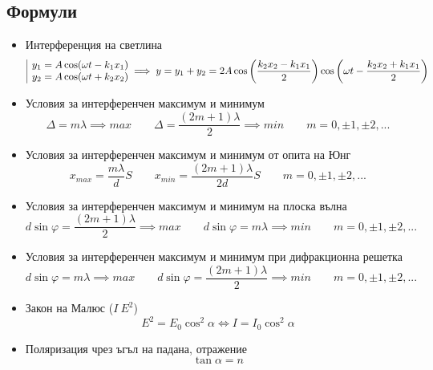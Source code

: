 \documentclass[fleqn, 12pt]{article}
\theoremstyle{definition}
\begin{document}
\subsection{Формули}
\begin{itemize}
\item Интерференция на светлина
$$\begin{array}{|l@{}} 
y_1 = A \cos (\omega t - k_1x_1)\\ 
y_2 = A \cos (\omega t + k_2x_2)
 \end{array} \implies y = y_1 + y_2 = 
2A\cos \left( \frac{k_2x_2 - k_1x_1}{2} \right) \cos \left( \omega t - \frac{k_2x_2 + k_1x_1}{2} \right) $$
\item Условия за интерференчен максимум и минимум
$$\Delta = m\lambda \implies max \qquad \Delta = \frac{(2m+1)\lambda}{2} \implies min \qquad m = 0, \pm1, \pm 2, ...$$
\item Условия за интерференчен максимум и минимум от опита на Юнг
$$ x_{max} = \frac{m\lambda}{d}S \qquad x_{min} = \frac{(2m+1)\lambda}{2d}S  \qquad m = 0, \pm1, \pm 2, ...$$
\item Условия за интерференчен максимум и минимум на плоска вълна
$$d\sin\varphi = \frac{(2m+1)\lambda}{2} \implies max \qquad d\sin\varphi = m\lambda \implies min \qquad m = 0, \pm1, \pm 2, ...$$
\item Условия за интерференчен максимум и минимум при дифракционна решетка
$$d\sin\varphi =  m\lambda \implies max \qquad d\sin\varphi = \frac{(2m+1)\lambda}{2} \implies min \qquad m = 0, \pm1, \pm 2, ...$$
\item Закон на Малюс ($I ~ E^2$)
$$E^2 = E_0 \cos^2 \alpha \Leftrightarrow I = I_0 \cos^2 \alpha$$
\item Поляризация чрез ъгъл на падана, отражение
$$\tan \alpha = n$$
\end{itemize}
\end{document}
